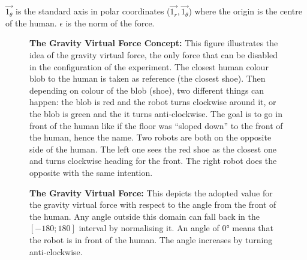 \documentclass[oneside, a4paper, 12pt]{memoir}
\newcommand{\epuckblue}[3][0] %
{
	\draw [very thick, fill=RoyalBlue] (#2,#3) circle [radius=0.5];
	\draw [very thick, rotate around={#1:(#2,#3)}] (#2-0.25,#3-0.433) -- (#2,#3+0.45) -- (#2+0.25,#3-0.433);
}
\newcommand{\human}[3][0] %
{
	\draw [very thick, fill=white, rotate around={#1:(#2,#3)}] (#2-1,#3+0.5) ellipse (0.25cm and 0.5cm);
	\draw [very thick, fill=white, rotate around={#1:(#2,#3)}] (#2+1,#3+0.5) ellipse (0.25cm and 0.5cm);
	\draw [very thick, fill=white, rotate around={#1:(#2,#3)}] (#2,#3) ellipse (1.5cm and 0.75cm);
	\draw [thick, fill=white, rotate around={#1:(#2,#3)}] (#2-0.05,#3+1) -- (#2,#3+1.1) -- (#2+0.05,#3+1);
	\draw [very thick, fill=white, rotate around={#1:(#2,#3)}] (#2,#3+0.5) circle [radius=0.5cm];
}
\let\oldCaption\caption
\renewcommand{\caption}[2]{
\oldCaption[#1]{{\small\sffamily\bfseries #1:} #2}
}
\begin{document}
\begin{itemize}
				$\vec{1_\theta}$ is the standard axis in polar coordinates ($\vec{1_r},\vec{1_\theta}$) where the origin is the centre of the human. $\epsilon$ is the norm of the force.
				
				\begin{figure}\centering
					
					\caption{The Gravity Virtual Force Concept}{This figure illustrates the idea of the gravity virtual force, the only force that can be disabled in the configuration of the experiment. The closest human colour blob to the human is taken as reference (the closest shoe). Then depending on colour of the blob (shoe), two different things can happen: the blob is red and the robot turns clockwise around it, or the blob is green and the it turns anti-clockwise. The goal is to go in front of the human like if the floor was \enquote{sloped down} to the front of the human, hence the name. Two robots are both on the opposite side of the human. The left one sees the red shoe as the closest one and turns clockwise heading for the front. The right robot does the opposite with the same intention.}
					\label{fig:gravity_force_idea}
				\end{figure}
				
				\begin{figure}\centering
					
					\caption{The Gravity Virtual Force}{This depicts the adopted value for the gravity virtual force with respect to the angle from the front of the human. Any angle outside this domain can fall back in the $[-180;180]$ interval by normalising it. An angle of 0° means that the robot is in front of the human. The angle increases by turning anti-clockwise.}
					\label{fig:gravity_force}
				\end{figure}
			\end{itemize}
			
\end{document}
